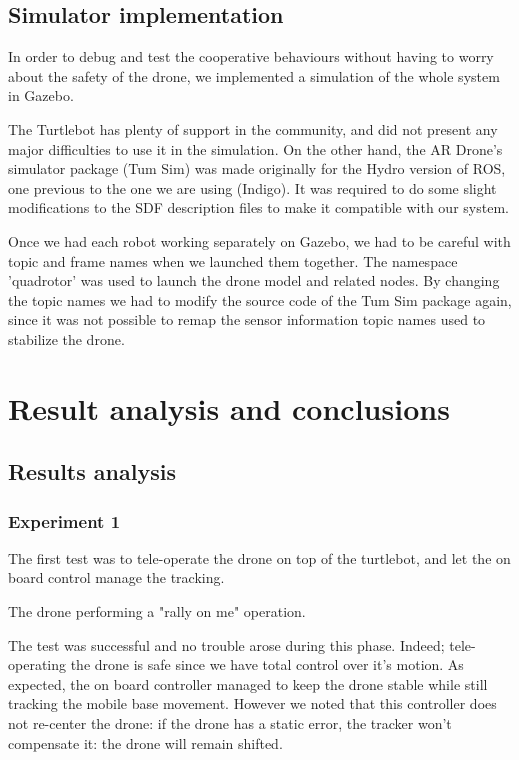 \documentclass[11pt,a4paper]{article}
\begin{document}
\subsection{Simulator implementation}
In order to debug and test the cooperative behaviours without having to worry about the safety of the drone, we implemented a simulation of the whole system in Gazebo.

The Turtlebot has plenty of support in the community, and did not present any major difficulties to use it in the simulation. On the other hand, the AR Drone's simulator package (Tum Sim) was made originally for the Hydro version of ROS, one previous to the one we are using (Indigo). It was required to do some slight modifications to the SDF description files to make it compatible with our system.

Once we had each robot working separately on Gazebo, we had to be careful with topic and frame names when we launched them together. The namespace 'quadrotor' was used to launch the drone model and related nodes. By changing the topic names we had to modify the source code of the Tum Sim package again, since it was not possible to remap the sensor information topic names used to stabilize the drone.


\section{Result analysis and conclusions}
\subsection{Results analysis}
\subsubsection{Experiment 1}
The first test was to tele-operate the drone on top of the turtlebot, and let the on board control
manage the tracking.

The drone performing a "rally on me" operation.

The test was successful and no trouble arose during this phase. Indeed; tele-operating the drone is 
safe since we have total control over it's motion.
As expected, the on board controller managed to keep the drone stable while still tracking the mobile base 
movement. However we noted that this controller does not re-center the drone: if the drone has a static
error, the tracker won't compensate it: the drone will remain shifted.
\end{document}
